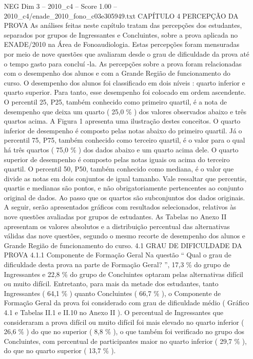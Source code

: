 \begin{textsample}{NEG Dim 3 – 2010\_c4 – Score 1.00 – 2010\_c4/enade\_2010\_fono\_c03e305949.txt}  \label{ex:f3_neg_121}
CAPÍTULO 4 PERCEPÇÃO DA PROVA As análises feitas neste capítulo tratam das percepções dos estudantes, separados por grupos de Ingressantes e Concluintes, sobre a prova aplicada no ENADE/2010 na Área de Fonoaudiologia.
Estas percepções foram mensuradas por meio de nove questões que avaliaram desde o grau de dificuldade da prova até o tempo gasto para concluí -la.
As percepções sobre a prova foram relacionadas com o desempenho dos alunos e com a Grande Região de funcionamento do curso.
O desempenho dos alunos foi classificado em dois níveis : quarto inferior e quarto superior.
Para tanto, esse desempenho foi colocado em ordem ascendente.
O percentil 25, P25, também conhecido como primeiro quartil, é a nota de desempenho que deixa um quarto ( 25,0 \% ) dos valores observados abaixo e três quartos acima.
A Figura 1 apresenta uma ilustração destes conceitos.
O quarto inferior de desempenho é composto pelas notas abaixo do primeiro quartil.
Já o percentil 75, P75, também conhecido como terceiro quartil, é o valor para o qual há três quartos ( 75,0 \% ) dos dados abaixo e um quarto acima dele.
O quarto superior de desempenho é composto pelas notas iguais ou acima do terceiro quartil.
O percentil 50, P50, também conhecido como mediana, é o valor que divide as notas em dois conjuntos de igual tamanho.
Vale ressaltar que percentis, quartis e medianas são pontos, e não obrigatoriamente pertencentes ao conjunto original de dados.
Ao passo que os quartos são subconjuntos dos dados originais.
A seguir, serão apresentados gráficos com resultados selecionados, relativos às nove questões avaliadas por grupos de estudantes.
As Tabelas no Anexo II apresentam os valores absolutos e a distribuição percentual das alternativas válidas das nove questões, segundo o mesmo recorte de desempenho dos alunos e Grande Região de funcionamento do curso. 4.1 GRAU DE DIFICULDADE DA PROVA 4.1.1 Componente de Formação Geral Na questão “ Qual o grau de dificuldade desta prova na parte de Formação Geral? ”, 17,3 \% do grupo de Ingressantes e 22,8 \% do grupo de Concluintes optaram pelas alternativas difícil ou muito difícil.
Entretanto, para mais da metade dos estudantes, tanto Ingressantes ( 64,1 \% ) quanto Concluintes ( 66,7 \% ), o Componente de Formação Geral da prova foi considerado com grau de dificuldade médio ( Gráfico 4.1 e Tabelas II.1 e II.10 no Anexo II ).
O percentual de Ingressantes que consideraram a prova difícil ou muito difícil foi mais elevado no quarto inferior ( 26,6 \% ) do que no superior ( 8,8 \% ), o que também foi verificado no grupo dos Concluintes, com percentual de participantes maior no quarto inferior ( 29,7 \% ), do que no quarto superior ( 13,7 \% ).

\end{textsample}
